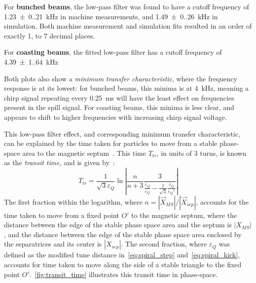 \documentclass[11pt]{report}
\begin{document}
For \textbf{bunched beams}, the low-pass filter was found to have a cutoff frequency of \qty[separate-uncertainty = true]{1.23(0.21)}{\kilo\hertz} in machine measurements, and \qty[separate-uncertainty = true]{1.49(0.26)}{\kilo\hertz} in simulation. Both machine measurement and simulation fits resulted in an order of exactly 1, to 7 decimal places.

For \textbf{coasting beams}, the fitted low-pass filter has a cutoff frequency of \qty[separate-uncertainty = true]{4.39(1.64)}{\kilo\hertz}


Both plots also show a \textit{minimum transfer characteristic}, where the frequency response is at its lowest: for bunched beams, this minima is at \qty{4}{\kilo\hertz}, meaning a chirp signal repeating every \qty{0.25}{\milli\second} will have the least effect on frequencies present in the spill signal. For coasting beams, this minima is less clear, and appears to shift to higher frequencies with increasing chirp signal voltage.

This low-pass filter effect, and corresponding minimum transfer characteristic, can be explained by the time taken for particles to move from a stable phase-space area to the magnetic septum~\cite{Sorge_2018}. This time $T_{tr}$, in units of 3 turns, is known as the \textit{transit time}, and is given by~\cite{Pullia:313678, Bryant:CAS}:
\begin{equation}
  T_{tr} = \frac 1{\sqrt{3}{\varepsilon_Q}} \ln \left| \frac n{n+3} \frac 3{\frac {\dot {\varepsilon_Q}}{\varepsilon_Q} - \frac 1{\sqrt 3}\frac{\dot{{\varepsilon_Q}}}{{{\varepsilon_Q}}^2}}\right|
  \label{eq:transit_time}
\end{equation} 
The first fraction within the logarithm, where $n=|\vec X_{MS}|/|\vec X_{sep}|$, accounts for the time taken to move from a fixed point $O'$ to the magnetic septum, where the distance between the edge of the stable phase space area and the septum is $|X_{MS}|$, and the distance between the edge of the stable phase space area enclosed by the separatrices and its center is $|X_{sep}|$. The second fraction, where ${\varepsilon_Q}$ was defined as the modified tune distance in~\autoref{eq:spiral_step} and~\autoref{eq:spiral_kick}, accounts for time taken to move along the side of a stable triangle to the fixed point $O'$.~\autoref{fig:transit_time} illustrates this transit time in phase-space.
\end{document}
